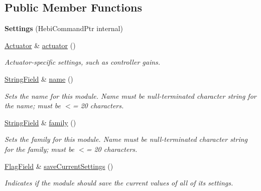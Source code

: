 \subsection*{Public Member Functions}
\begin{DoxyCompactItemize}
\item 
\mbox{\label{classhebi_1_1Command_1_1Settings_a06498b4c88f3cb5567779ab350c312d9}} 
{\bfseries Settings} (Hebi\+Command\+Ptr internal)
\item 
\mbox{\label{classhebi_1_1Command_1_1Settings_a1514712e585fd0c00389fa82c214be33}} 
\hyperlink{classhebi_1_1Command_1_1Settings_1_1Actuator}{Actuator} \& \hyperlink{classhebi_1_1Command_1_1Settings_a1514712e585fd0c00389fa82c214be33}{actuator} ()
\begin{DoxyCompactList}\small\item\em Actuator-\/specific settings, such as controller gains. \end{DoxyCompactList}\item 
\mbox{\label{classhebi_1_1Command_1_1Settings_a86561f33ef1ceaa4e0e50e125433a4f7}} 
\hyperlink{classhebi_1_1Command_1_1StringField}{String\+Field} \& \hyperlink{classhebi_1_1Command_1_1Settings_a86561f33ef1ceaa4e0e50e125433a4f7}{name} ()
\begin{DoxyCompactList}\small\item\em Sets the name for this module. Name must be null-\/terminated character string for the name; must be $<$= 20 characters. \end{DoxyCompactList}\item 
\mbox{\label{classhebi_1_1Command_1_1Settings_a50847ab47e72c2edb25fdd88766eb18d}} 
\hyperlink{classhebi_1_1Command_1_1StringField}{String\+Field} \& \hyperlink{classhebi_1_1Command_1_1Settings_a50847ab47e72c2edb25fdd88766eb18d}{family} ()
\begin{DoxyCompactList}\small\item\em Sets the family for this module. Name must be null-\/terminated character string for the family; must be $<$= 20 characters. \end{DoxyCompactList}\item 
\mbox{\label{classhebi_1_1Command_1_1Settings_aeaa64ec02978581bcf4d3d55ad4c3781}} 
\hyperlink{classhebi_1_1Command_1_1FlagField}{Flag\+Field} \& \hyperlink{classhebi_1_1Command_1_1Settings_aeaa64ec02978581bcf4d3d55ad4c3781}{save\+Current\+Settings} ()
\begin{DoxyCompactList}\small\item\em Indicates if the module should save the current values of all of its settings. \end{DoxyCompactList}\end{DoxyCompactItemize}


